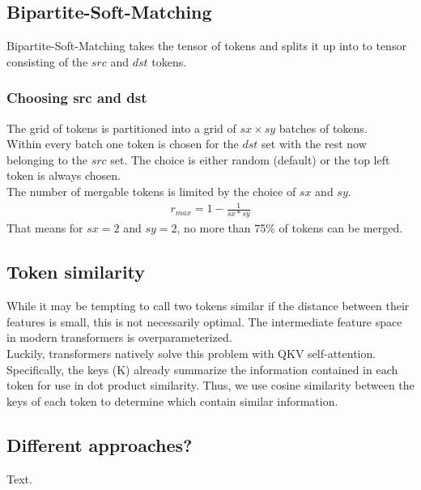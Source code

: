\subsection{Bipartite-Soft-Matching}
Bipartite-Soft-Matching takes the tensor of tokens and splits it up into to tensor consisting of the \(src\) and \(dst\) tokens. 

\subsubsection*{Choosing src and dst}
The grid of tokens is partitioned into a grid of \(sx \times sy\) batches of tokens.\\
Within every batch one token is chosen for the \(dst\) set with the rest now belonging to the \(src\) set. The choice is either random (default) or the top left token is always chosen.\\
The number of mergable tokens is limited by the choice of \(sx\) and \(sy\).
\begin{align*}
    r_{max} = 1-\frac{1}{sx*sy}
\end{align*}
That means for \(sx = 2\) and \(sy = 2\), no more than 75\% of tokens can be merged.

\subsection{Token similarity}
While it may be tempting to call two tokens similar if the distance between their features is small, this is not necessarily optimal. The intermediate feature space in modern transformers is overparameterized.\\ Luckily, transformers natively solve this problem with QKV self-attention\cite{vaswani2017attention}.
Specifically, the keys (K) already summarize the information contained in each token for use in dot product similarity. Thus, we use cosine similarity between the keys of each token to determine which contain similar information\cite{bolya2023tome}.

\subsection{Different approaches?}
Text.

